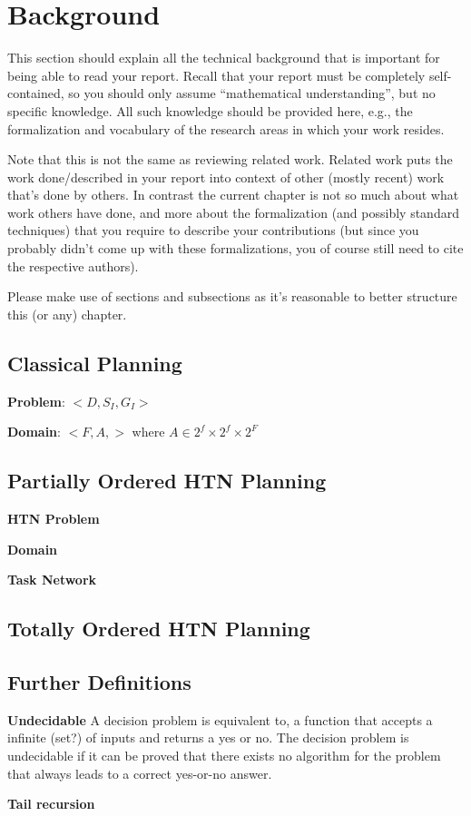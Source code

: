 \chapter{Background}\label{chap:background}

This section should explain all the technical background that is important for being able to read your report. Recall that your report must be completely self-contained, so you should only assume ``mathematical understanding'', but no specific knowledge. All such knowledge should be provided here, e.g., the formalization and vocabulary of the research areas in which your work resides.

Note that this is not the same as reviewing related work. Related work puts the work done/described in your report into context of other (mostly recent) work that's done by others. In contrast the current chapter is not so much about what work others have done, and more about the formalization (and possibly standard techniques) that you require to describe your contributions (but since you probably didn't come up with these formalizations, you of course still need to cite the respective authors).

Please make use of sections and subsections as it's reasonable to better structure this (or any) chapter.



\section{Classical Planning}
\textbf{Problem}: $<D, S_I, G_I>$

\textbf{Domain}: $<F, A, >$
where $A \in 2^f \times 2^f \times 2^F$
 

\section{Partially Ordered HTN Planning}
\textbf{HTN Problem}

\textbf{Domain}

\textbf{Task Network}

\section{Totally Ordered HTN Planning}


\section{Further Definitions}
\textbf{Undecidable } A decision problem is equivalent to, a function that accepts a infinite (set?) of inputs and returns a yes or no. The decision problem is undecidable if it can be proved that there exists no algorithm for the problem that always leads to a correct yes-or-no answer.

\textbf{Tail recursion}